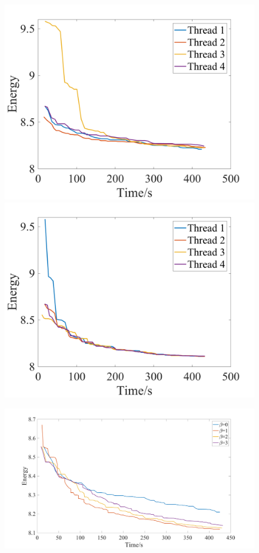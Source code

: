 \begin{figure}[tb]
  \includegraphics[width=\columnwidth * 0.5]{figure/optical_flow_PFM_threads.png}
  \includegraphics[width=\columnwidth * 0.5]{figure/optical_flow_SF_MF_threads.png}
  \caption{}\label{fig:optical_flow_by_threads}
\end{figure}
\begin{figure}[tb]
  \includegraphics[width=\columnwidth]{figure/optical_flow_by_beta.png}
  \caption{}\label{fig:optical_flow_by_beta}
\end{figure}
